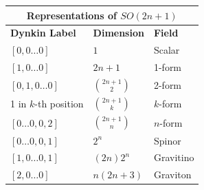 \vspace{1em}

\begin{center}
\begin{tabular}{p{} p{} p{}}
\toprule
\multicolumn{3}{c}{\textbf{Representations of } $SO(2n+1)$} \\
\midrule
\textbf{Dynkin Label} & \textbf{Dimension} & \textbf{Field} \\
\midrule
$[0,0\ldots 0]$                     & $1$                    & Scalar \\
$[1,0\ldots 0]$                     & $2n+1$                 & 1-form \\
$[0,1,0\ldots 0]$                  & $\binom{2n+1}{2}$      & 2-form \\
1 in $k$-th position                 & $\binom{2n+1}{k}$      & $k$-form \\
$[0\ldots 0,0,2]$                  & $\binom{2n+1}{n}$      & $n$-form \\
$[0\ldots 0,0,1]$                  & $2^{n}$              & Spinor \\
$[1,0\ldots 0,1]$                  & $(2n)2^{n}$          & Gravitino \\
$[2,0\ldots 0]$                     & $n(2n+3)$              & Graviton \\
\bottomrule
\end{tabular}
\end{center}
